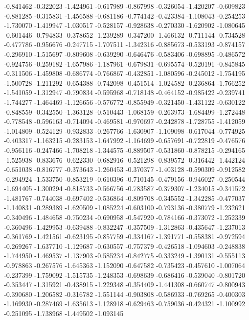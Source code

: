 -0.841462
-0.322023
-1.424961
-0.617989
-0.867998
-0.326054
-1.420207
-0.609823
-0.881285
-0.315831
-1.456588
-0.681186
-0.774142
-0.423384
-1.108043
-0.254253
-1.730070
-1.419947
-1.030517
-0.528157
-0.928638
-0.270330
-1.620902
-1.080645
-0.601446
-0.794833
-0.378652
-1.239289
-0.347200
-1.466132
-0.711144
-0.734528
-0.477786
-0.956676
-0.247715
-1.707511
-1.342316
-0.885673
-0.533193
-0.874157
-0.296910
-1.515697
-0.809608
-0.639290
-0.646476
-0.583406
-0.698895
-0.486572
-0.924756
-0.259182
-1.657986
-1.187961
-0.679831
-0.695574
-0.520191
-0.845845
-0.311506
-1.459808
-0.686774
-0.766867
-0.432851
-1.080596
-0.245012
-1.754195
-1.500728
-1.211292
-0.654388
-0.742098
-0.451514
-1.024582
-0.236864
-1.766252
-1.541059
-1.312947
-0.790834
-0.595968
-0.718148
-0.464152
-0.985422
-0.239741
-1.744277
-1.464469
-1.126656
-0.576772
-0.855949
-0.321450
-1.431122
-0.630122
-0.848559
-0.342550
-1.363128
-0.510443
-1.068159
-0.263973
-1.684499
-1.272448
-0.778548
-0.596163
-0.714094
-0.469581
-0.970697
-0.242878
-1.728755
-1.412059
-1.014809
-0.524129
-0.932833
-0.267766
-1.630907
-1.109098
-0.617044
-0.774925
-0.403317
-1.163215
-0.283153
-1.647992
-1.164699
-0.657691
-0.722819
-0.476576
-0.956116
-0.247466
-1.708218
-1.344575
-0.889507
-0.531860
-0.878215
-0.294165
-1.525938
-0.833676
-0.622330
-0.682916
-0.521298
-0.839572
-0.316442
-1.442124
-0.651038
-0.816777
-0.373643
-1.260453
-0.370377
-1.403128
-0.590309
-0.912582
-0.294924
-1.533750
-0.853219
-0.610396
-0.710145
-0.479156
-0.946027
-0.250544
-1.694405
-1.300294
-0.818733
-0.566756
-0.783587
-0.379307
-1.234015
-0.341572
-1.481767
-0.744038
-0.697402
-0.536864
-0.809708
-0.345552
-1.342285
-0.477037
-1.140831
-0.289389
-1.620509
-1.085224
-0.603100
-0.793136
-0.380779
-1.232621
-0.340496
-1.484658
-0.750234
-0.690958
-0.547920
-0.784166
-0.373072
-1.252339
-0.360496
-1.429953
-0.639488
-0.832247
-0.357509
-1.312863
-0.435647
-1.237013
-0.361769
-1.421561
-0.623195
-0.857759
-0.334167
-1.391771
-0.558381
-0.972594
-0.269267
-1.637710
-1.129687
-0.630557
-0.757379
-0.426518
-1.094603
-0.248838
-1.744950
-1.469537
-1.137903
-0.585234
-0.842775
-0.333249
-1.390131
-0.555113
-0.978863
-0.267576
-1.645363
-1.152090
-0.647582
-0.735423
-0.457610
-1.007064
-0.237399
-1.759092
-1.515735
-1.248353
-0.698639
-0.686416
-0.539040
-0.801720
-0.353447
-1.315921
-0.438915
-1.229348
-0.354409
-1.441308
-0.660747
-0.800943
-0.390680
-1.206582
-0.316782
-1.551144
-0.903808
-0.586933
-0.769265
-0.400303
-1.169930
-0.287469
-1.635613
-1.128918
-0.629463
-0.759036
-0.424321
-1.100992
-0.251095
-1.738968
-1.449502
-1.093145
